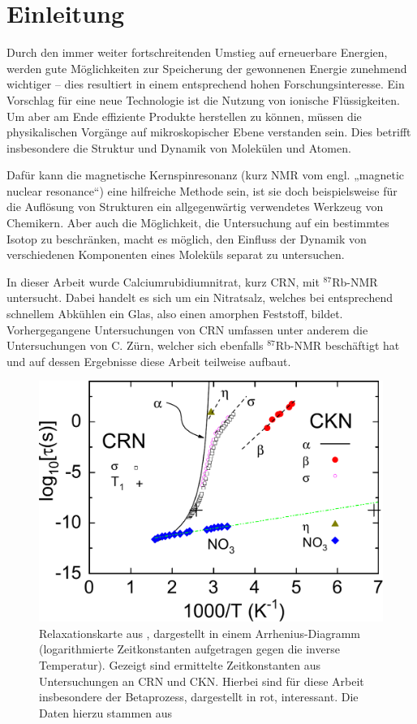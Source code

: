 \chapter{Einleitung}


Durch den immer weiter fortschreitenden Umstieg auf erneuerbare Energien, werden gute Möglichkeiten zur Speicherung der gewonnenen Energie zunehmend wichtiger -- dies resultiert in einem entsprechend hohen Forschungsinteresse. Ein Vorschlag für eine neue Technologie ist die Nutzung von ionische Flüssigkeiten. Um aber am Ende effiziente Produkte herstellen zu können, müssen die physikalischen Vorgänge auf mikroskopischer Ebene verstanden sein. Dies betrifft insbesondere die Struktur und Dynamik von Molekülen und Atomen. 

Dafür kann die magnetische Kernspinresonanz (kurz NMR vom engl. „magnetic nuclear resonance“) eine hilfreiche Methode sein, ist sie doch beispielsweise für die Auflösung von Strukturen ein allgegenwärtig verwendetes Werkzeug von Chemikern. Aber auch die Möglichkeit, die Untersuchung auf ein bestimmtes Isotop zu beschränken, macht es möglich, den Einfluss der Dynamik von verschiedenen Komponenten eines Moleküls separat zu untersuchen.

In dieser Arbeit wurde Calciumrubidiumnitrat, kurz CRN, mit $^\text{87}$Rb-NMR untersucht. Dabei handelt es sich um ein Nitratsalz, welches bei entsprechend schnellem Abkühlen ein Glas, also einen amorphen Feststoff, bildet. Vorhergegangene Untersuchungen von CRN umfassen unter anderem die Untersuchungen von C. Zürn, welcher sich ebenfalls $^\text{87}$Rb-NMR beschäftigt hat \cite{zuern_paper} und auf dessen Ergebnisse diese Arbeit teilweise aufbaut.
\begin{figure}
	\begin{center}
		\includegraphics[width=.7\textwidth]{graphics/zuern/Plot1_b.pdf}
	\end{center}
	\caption{Relaxationskarte aus \cite{zuern_paper}, dargestellt in einem Arrhenius-Diagramm (logarithmierte Zeitkonstanten aufgetragen gegen die inverse Temperatur). Gezeigt sind ermittelte Zeitkonstanten aus Untersuchungen an CRN und CKN. Hierbei sind für diese Arbeit insbesondere der Betaprozess, dargestellt in rot, interessant. Die Daten hierzu stammen aus \cite{}} \label{fig:einl:zuernpaper}
\end{figure}

